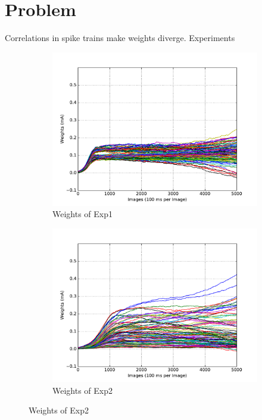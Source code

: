 \section{Problem}
Correlations in spike trains make weights diverge.
Experiments
\begin{figure}
	\centering
	\begin{subfigure}[t]{0.4\textwidth}
		\includegraphics[width=\textwidth]{pics_sdlm/00_exp_SAE_Orig/exp1_weights_s.pdf}
		\caption{Weights of Exp1}
	\end{subfigure}
	\begin{subfigure}[t]{0.4\textwidth}
		\includegraphics[width=\textwidth]{pics_sdlm/00_exp_SAE_Orig/exp2_weights_s.pdf}
		\caption{Weights of Exp2}

\end{subfigure}
\end{figure}
